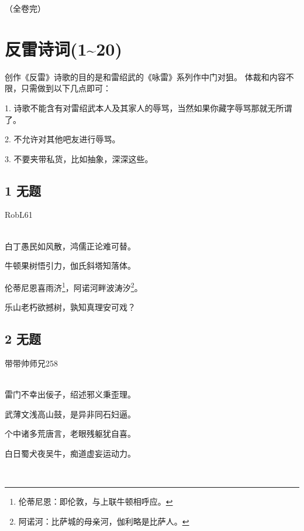 \documentclass[UTF8,12pt,oneside]{ctexbook}
\begin{document}
    \hfill{（全卷完）}
    
     \chapter{反雷诗词(1\textasciitilde20)}
    创作《反雷》诗歌的目的是和雷绍武的《咏雷》系列作中门对狙。
    体裁和内容不限，只需做到以下几点即可：
    
    1. 诗歌不能含有对雷绍武本人及其家人的辱骂，当然如果你藏字辱骂那就无所谓了。
    
    2. 不允许对其他吧友进行辱骂。
    
    3. 不要夹带私货，比如抽象，深深这些。
    
    \begin{flushright}
        \songti
    \end{flushright}
    
    \section{1 无题}
    \begin{center}
        RobL61
        
        ~\\
        白丁愚民如风散，鸿儒正论难可替。
        
        牛顿果树悟引力，伽氏斜塔知落体。
        
        伦蒂尼恩喜雨济\footnote{伦蒂尼恩：即伦敦，与上联牛顿相呼应。}，阿诺河畔波涛汐\footnote{阿诺河：比萨城的母亲河，伽利略是比萨人。}。
        
        乐山老朽欲撼树，孰知真理安可戏？

    \end{center}
    
    \newpage
    
    \section{2 无题}
    \begin{center}
        带带帅师兄258
        
        ~\\
        雷门不幸出佞子，绍述邪义秉歪理。
        
        武薄文浅高山鼓，是异非同石妇逼。
        
        个中诸多荒唐言，老眼残躯犹自喜。
        
        白日蜀犬夜吴牛，痴道虚妄运动力。
        
        ~\\
        
    \end{center}
    
\end{document}
